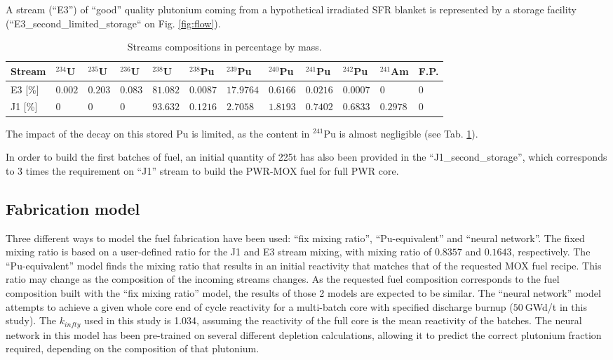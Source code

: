 \documentclass{anstrans}
\begin{document}
A stream (``E3'') of ``good'' quality plutonium coming from a hypothetical irradiated
SFR blanket is represented by a storage facility
(``E3\_second\_limited\_storage`` on Fig. \ref{fig:flow}).

\begin{table}[htb]
  \centering
  \caption{Streams compositions in percentage by mass.}
  \begin{tabular}{llllllllllll}\toprule
    Stream 
    & $^{234}$U   & $^{235}$U   & $^{236}$U   & $^{238}$U   
    & $^{238}$Pu  & $^{239}$Pu  & $^{240}$Pu  & $^{241}$Pu  & $^{242}$Pu 
    & $^{241}$Am  & F.P. \\ \midrule
    E3 [\%]
    & $0.002$   & $0.203$    & $0.083$   & $81.082$
    & $0.0087$  & $17.9764$  & $0.6166$  & $0.0216$  & $0.0007$
    & $0$         & $0$ \\
    J1 [\%]
    & $0$       & $0$        & $0$       & $93.632$
    & $0.1216$  & $2.7058$   & $1.8193$  & $0.7402$  & $0.6833$
    & $0.2978$  & $0$ \\
    \bottomrule
  \end{tabular}
  \label{tab:stream_compo}
\end{table}

The impact of the decay on this stored Pu is limited, as the content in
$^{241}$Pu is almost negligible (see Tab. \ref{tab:stream_compo}).  
 
In order to build the first batches of fuel, an initial quantity of 225t has
also been provided in the ``J1\_second\_storage'', which corresponds to 3 times
the requirement on ``J1'' stream to build the PWR-MOX fuel for full PWR
core. 




\subsection{Fabrication model}
Three different ways to model the fuel fabrication have been used: ``fix mixing
ratio'', ``Pu-equivalent'' and ``neural network''.
The fixed mixing ratio is based on a user-defined ratio for the J1 and E3 stream
mixing, with mixing ratio of $0.8357$ and $0.1643$, respectively.
The ``Pu-equivalent'' model finds the mixing ratio that results in an initial
reactivity that matches that of the requested MOX fuel recipe.  This ratio may
change as the composition of the incoming streams changes.  As the requested
fuel composition corresponds to the fuel composition built with the ``fix mixing
ratio'' model, the results of those 2 models are expected to be similar.  The
``neural network'' model attempts to achieve a given whole core end of cycle 
reactivity for a multi-batch core with specified discharge burnup ($50~$GWd/t in this
study). The $k_{infty}$ used in this study is 1.034, assuming the reactivity of
the full core is the mean reactivity of the batches. The neural network in this
model has been pre-trained on several different depletion calculations, allowing
it to predict the correct plutonium fraction required, depending on the
composition of that plutonium.
\end{document}
